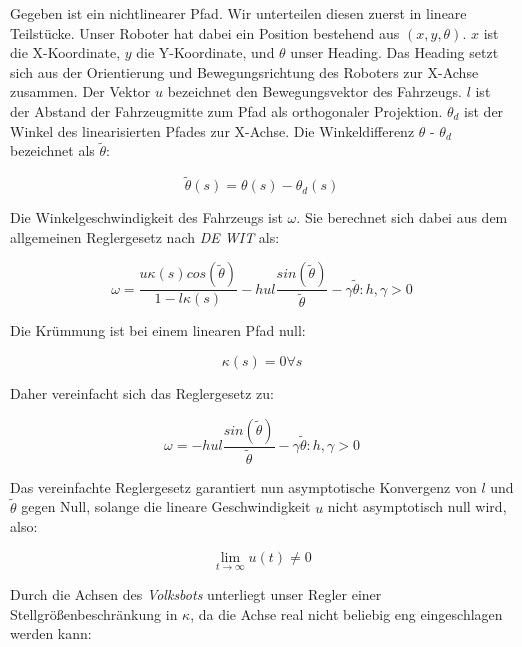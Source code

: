 \documentclass[11pt,a4paper]{article}
\begin{document}
Gegeben ist ein nichtlinearer Pfad. Wir unterteilen diesen zuerst in lineare Teilstücke. Unser Roboter hat dabei 
ein Position bestehend aus $(x,y,\theta)$. $x$ ist die X-Koordinate, $y$ die Y-Koordinate, und $\theta$ unser Heading.
Das Heading setzt sich aus der Orientierung und Bewegungsrichtung des Roboters zur X-Achse zusammen. Der Vektor $u$ bezeichnet den Bewegungsvektor des Fahrzeugs.
$l$ ist der Abstand der Fahrzeugmitte zum Pfad als orthogonaler Projektion. $\theta_d$ ist der Winkel des linearisierten Pfades zur X-Achse. Die Winkeldifferenz $\theta$ - $\theta_d$ bezeichnet 
\cite{INDIVERI2004185} als $\tilde{\theta}$: 

\begin{equation}
  \tilde{\theta}(s) = \theta(s) - \theta_d(s)
\end{equation}

Die Winkelgeschwindigkeit des Fahrzeugs ist $\omega$. Sie berechnet sich dabei aus dem allgemeinen Reglergesetz nach \textit{DE WIT}\cite{wit1993nonlinear} als:

\begin{equation}
  \omega = \frac{u\kappa(s)cos(\tilde{\theta})}{1-l\kappa(s)} - hul\frac{sin(\tilde{\theta})}{\tilde{\theta}}-\gamma\tilde{\theta} : h,\gamma > 0
\end{equation}

Die Krümmung ist bei einem linearen Pfad null:

\begin{equation}
  \kappa(s) = 0 \forall s
\end{equation}

Daher vereinfacht sich das Reglergesetz zu:

\begin{equation}
  \omega = -hul\frac{sin(\tilde{\theta})}{\tilde{\theta}}-\gamma\tilde{\theta} : h,\gamma > 0
\end{equation}


Das vereinfachte Reglergesetz garantiert nun asymptotische Konvergenz von $l$ und $\tilde{\theta}$ gegen Null, solange die lineare Geschwindigkeit $u$ nicht asymptotisch
null wird, also: 

\begin{equation}
  \lim_{t \to \infty} u(t) \neq 0
\end{equation}

Durch die Achsen des \textit{Volksbots} unterliegt unser Regler einer Stellgrößenbeschränkung in $\kappa$, da die Achse real nicht beliebig eng eingeschlagen werden kann:
\end{document}
